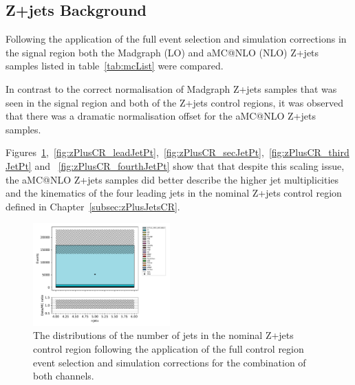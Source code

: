\subsection{Z+jets Background}\label{subsec:zPlusJetsEstimation}
Following the application of the full event selection and simulation corrections in the signal region both the Madgraph (LO) and aMC@NLO (NLO) Z+jets samples listed in table~\ref{tab:mcList} were compared.

In contrast to the correct normalisation of Madgraph Z+jets samples that was seen in the signal region and both of the Z+jets control regions, it was observed that there was a dramatic normalisation offset for the aMC@NLO Z+jets samples.

Figures~\ref{fig:zPlusCR_nJets},~\ref{fig:zPlusCR_leadJetPt},~\ref{fig:zPlusCR_secJetPt},~\ref{fig:zPlusCR_thirdJetPt} and ~\ref{fig:zPlusCR_fourthJetPt} show that that despite this scaling issue, the aMC@NLO Z+jets samples did better describe the higher jet multiplicities and the kinematics of the four leading jets in the nominal Z+jets control region defined in Chapter~\ref{subsec:zPlusJetsCR}.


\begin{figure}[tbp]
\centering
\includegraphics[width=0.47\textwidth]{figs/tzq-fullSelection-plots/plots_ee_zPlus/nJets.pdf}
\caption{
The distributions of the number of jets in the nominal Z+jets control region following the application of the full control region event selection and simulation corrections for the combination of both channels.
}
\label{fig:zPlusCR_nJets}
\end{figure}

